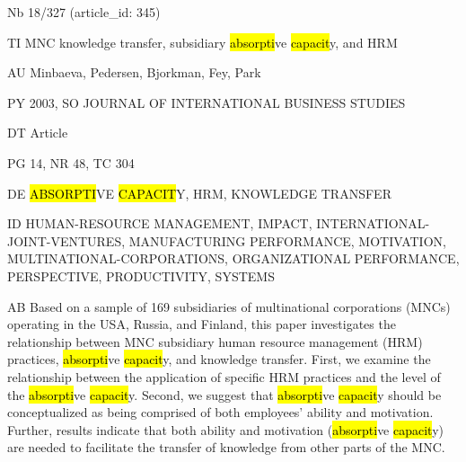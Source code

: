 \documentclass[a4paper]{article}
\begin{document}
\vspace*{-2cm}
Nb \tabto{0cm}18/327 (article\_id: 345)\par
TI \tabto{0cm}MNC knowledge transfer, subsidiary \hl{absorpti}ve \hl{capacit}y, and HRM\par
AU \tabto{0cm}Minbaeva, Pedersen, Bjorkman, Fey, Park\par
PY \tabto{0cm}2003, SO JOURNAL OF INTERNATIONAL BUSINESS STUDIES\par
DT \tabto{0cm}Article\par
PG \tabto{0cm}14, NR 48, TC 304\par
DE \tabto{0cm}\hl{ABSORPTI}VE \hl{CAPACIT}Y, HRM, KNOWLEDGE TRANSFER\par
ID \tabto{0cm}HUMAN-RESOURCE MANAGEMENT, IMPACT, INTERNATIONAL-JOINT-VENTURES, MANUFACTURING PERFORMANCE, MOTIVATION, MULTINATIONAL-CORPORATIONS, ORGANIZATIONAL PERFORMANCE, PERSPECTIVE, PRODUCTIVITY, SYSTEMS\par
AB \tabto{0cm}Based on a sample of 169 subsidiaries of multinational corporations (MNCs) operating in the USA, Russia, and Finland, this paper investigates the relationship between MNC subsidiary human resource management (HRM) practices, \hl{absorpti}ve \hl{capacit}y, and knowledge transfer. First, we examine the relationship between the application of specific HRM practices and the level of the \hl{absorpti}ve \hl{capacit}y. Second, we suggest that \hl{absorpti}ve \hl{capacit}y should be conceptualized as being comprised of both employees' ability and motivation. Further, results indicate that both ability and motivation (\hl{absorpti}ve \hl{capacit}y) are needed to facilitate the transfer of knowledge from other parts of the MNC.\par
\clearpage
\end{document}
